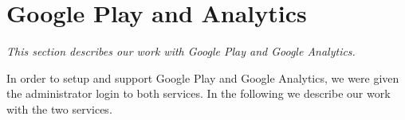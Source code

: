\section{Google Play and Analytics} \label{Sprint1_SecGooglePlayAndAnalytics}
\textit{This section describes our work with Google Play and Google Analytics.}

In order to setup and support Google Play and Google Analytics, we were given the administrator login to both services. In the following we describe our work with the two services.


